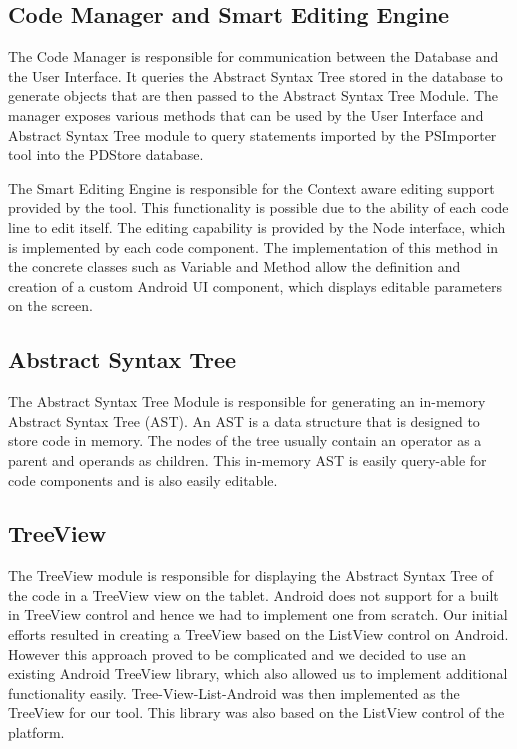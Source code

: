 \documentclass[10.5pt,twocolumn]{article}
\begin{document}
\subsection{Code Manager and Smart Editing Engine}
The Code Manager is responsible for communication between the Database and the User Interface. It queries the Abstract Syntax Tree stored in the database to generate objects that are then passed to the Abstract Syntax Tree Module. The manager exposes various methods that can be used by the User Interface and Abstract Syntax Tree module to query statements imported by the PSImporter tool into the PDStore database.

The Smart Editing Engine is responsible for the Context aware editing support provided by the tool. This functionality is possible due to the ability of each code line to edit itself. The editing capability is provided by the Node interface, which is implemented by each code component. The implementation of this method in the concrete classes such as Variable and Method allow the definition and creation of a custom Android UI component, which displays editable parameters on the screen.

\subsection{Abstract Syntax Tree}
The Abstract Syntax Tree Module is responsible for generating an in-memory Abstract Syntax Tree (AST).  An AST is a data structure that is designed to store code in memory. The nodes of the tree usually contain an operator as a parent and operands as children. This in-memory AST is easily query-able for code components and is also easily editable.

\subsection{TreeView}
The TreeView module is responsible for displaying the Abstract Syntax Tree of the code in a TreeView view on the tablet. Android does not support for a built in TreeView control and hence we had to implement one from scratch. Our initial efforts resulted in creating a TreeView based on the ListView control on Android. However this approach proved to be complicated and we decided to use an existing Android TreeView library, which also allowed us to implement additional functionality easily. Tree-View-List-Android was then implemented as the TreeView for our tool. This library was also based on the ListView control of the platform.
\end{document}
